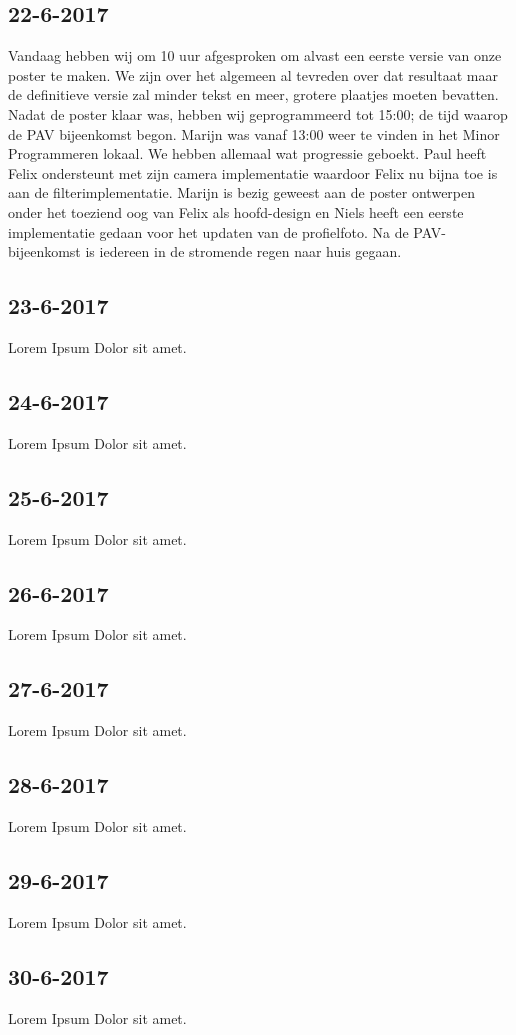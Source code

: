 \documentclass{uva-inf-article}
\begin{document}
\subsection{22-6-2017}
Vandaag hebben wij om 10 uur afgesproken om alvast een eerste versie van onze poster te maken. We zijn over het algemeen al tevreden over dat resultaat maar de definitieve versie zal minder tekst en meer, grotere plaatjes moeten bevatten.
Nadat de poster klaar was, hebben wij geprogrammeerd tot 15:00; de tijd waarop de PAV bijeenkomst begon.
Marijn was vanaf 13:00 weer te vinden in het Minor Programmeren lokaal. We hebben allemaal wat progressie geboekt. Paul heeft Felix ondersteunt met zijn camera implementatie waardoor Felix nu bijna toe is aan de filterimplementatie.
Marijn is bezig geweest aan de poster ontwerpen onder het toeziend oog van Felix als hoofd-design en Niels heeft een eerste implementatie gedaan voor het updaten van de profielfoto. Na de PAV-bijeenkomst is iedereen in de stromende regen naar huis gegaan.
\subsection{23-6-2017}
Lorem Ipsum Dolor sit amet.
\subsection{24-6-2017}
Lorem Ipsum Dolor sit amet.
\subsection{25-6-2017}
Lorem Ipsum Dolor sit amet.
\subsection{26-6-2017}
Lorem Ipsum Dolor sit amet.
\subsection{27-6-2017}
Lorem Ipsum Dolor sit amet.
\subsection{28-6-2017}
Lorem Ipsum Dolor sit amet.
\subsection{29-6-2017}
Lorem Ipsum Dolor sit amet.
\subsection{30-6-2017}
Lorem Ipsum Dolor sit amet.
\end{document}
